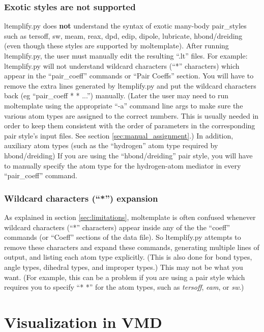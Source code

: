 \documentclass[11pt]{article}
\begin{document}
\subsubsection*{Exotic styles are not supported}
\label{sec:ltemplify_limitations_pair}
ltemplify.py does \textbf{not} understand the syntax of 
exotic many-body pair\_styles such as tersoff, sw, meam, reax, dpd, edip,
dipole, lubricate, hbond/dreiding 
(even though these styles are supported by moltemplate).
After running ltemplify.py, the user must manually edit the resulting ``.lt''
files.  For example: ltemplify.py will not understand wildcard characters 
(``*'' characters)
which appear in the ``pair\_coeff'' commands or ``Pair Coeffs'' section.
You will have to remove the extra lines generated by ltemplify.py and 
put the wildcard characters back (eg ``pair\_coeff * * ...'') manually.
(Later the user may need to run moltemplate using the appropriate ``-a'' 
 command line args to make sure the various atom types are assigned 
 to the correct numbers. This is usually needed in order to keep them 
 consistent with the order of parameters in the corresponding pair style's 
 input files. See section \ref{sec:manual_assignment}.)
In addition, auxiliary atom types (such as the ``hydrogen'' atom type
required by hbond/dreiding)
If you are using the ``hbond/dreiding'' pair style, you will 
have to manually specify the atom type for the hydrogen-atom mediator
in every ``pair\_coeff'' command.


\subsubsection*{Wildcard characters (``*'') expansion}
As explained in section \ref{sec:limitations},
moltemplate is often confused whenever wildcard characters (``*'' characters)
appear inside any of the the ``coeff'' commands 
(or ``Coeff'' sections of the data file).
So ltemplify.py attempts to remove these characters and expand these commands,
generating multiple lines of output, and listing each atom type explicitly.
(This is also done for bond types, angle types, dihedral types, 
 and improper types.)
This may not be what you want. 
(For example, this can be a problem if you are using a pair style 
which requires you to specify ``* *'' for the atom types, such as
\textit{tersoff}, \textit{eam}, or \textit{sw}.)


\section{Visualization in VMD}
\label{sec:vmd_advanced}
\end{document}

